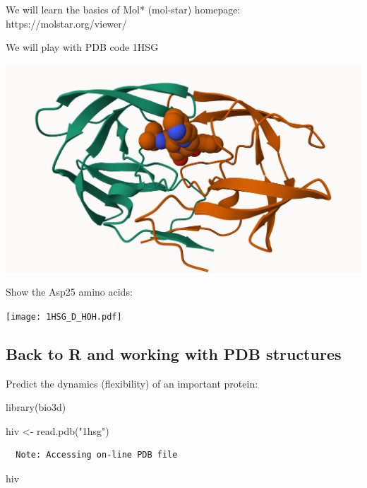 \documentclass[
  letterpaper,
  DIV=11,
  numbers=noendperiod]{scrartcl}
\newenvironment{Shaded}{\begin{snugshade}}{\end{snugshade}}
\newcommand{\FunctionTok}[1]{\textcolor[rgb]{0.28,0.35,0.67}{#1}}
\newcommand{\NormalTok}[1]{\textcolor[rgb]{0.00,0.23,0.31}{#1}}
\newcommand{\OtherTok}[1]{\textcolor[rgb]{0.00,0.23,0.31}{#1}}
\newcommand{\StringTok}[1]{\textcolor[rgb]{0.13,0.47,0.30}{#1}}
\begin{document}
We will learn the basics of Mol* (mol-star) homepage:
https://molstar.org/viewer/

We will play with PDB code 1HSG

\includegraphics{1HSG.png}

Show the Asp25 amino acids:

\texttt{[image: 1HSG\_D\_HOH.pdf]}

\hypertarget{back-to-r-and-working-with-pdb-structures}{%
\subsection{Back to R and working with PDB
structures}\label{back-to-r-and-working-with-pdb-structures}}

Predict the dynamics (flexibility) of an important protein:

\begin{Shaded}
\begin{Highlighting}[]
\FunctionTok{library}\NormalTok{(bio3d)}

\NormalTok{hiv }\OtherTok{\textless{}{-}} \FunctionTok{read.pdb}\NormalTok{(}\StringTok{"1hsg"}\NormalTok{)}
\end{Highlighting}
\end{Shaded}

\begin{verbatim}
  Note: Accessing on-line PDB file
\end{verbatim}

\begin{Shaded}
\begin{Highlighting}[]
\NormalTok{hiv}
\end{Highlighting}
\end{Shaded}
\end{document}
